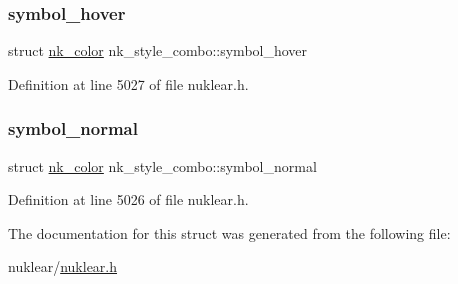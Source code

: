 \subsubsection{\texorpdfstring{symbol\+\_\+hover}{symbol\_hover}}
{\footnotesize\ttfamily struct \mbox{\hyperlink{structnk__color}{nk\+\_\+color}} nk\+\_\+style\+\_\+combo\+::symbol\+\_\+hover}



Definition at line 5027 of file nuklear.\+h.

\mbox{\label{structnk__style__combo_ae6acc5a734518b2d51f70e4c91657ea0}} 
\subsubsection{\texorpdfstring{symbol\+\_\+normal}{symbol\_normal}}
{\footnotesize\ttfamily struct \mbox{\hyperlink{structnk__color}{nk\+\_\+color}} nk\+\_\+style\+\_\+combo\+::symbol\+\_\+normal}



Definition at line 5026 of file nuklear.\+h.



The documentation for this struct was generated from the following file\+:\begin{DoxyCompactItemize}
\item 
nuklear/\mbox{\hyperlink{nuklear_8h}{nuklear.\+h}}\end{DoxyCompactItemize}
